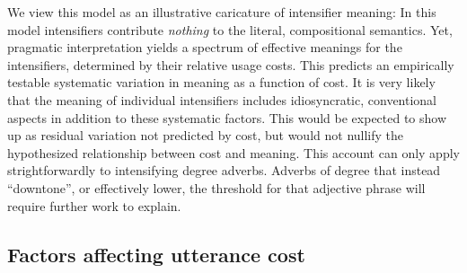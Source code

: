 \documentclass[10pt,letterpaper]{article}
\begin{document}
We view this model as an illustrative caricature of intensifier meaning: In this model intensifiers contribute \emph{nothing} to the literal, compositional semantics.
Yet, pragmatic interpretation yields a spectrum of effective meanings for the intensifiers, determined by their relative usage costs.
This predicts an empirically testable systematic variation in meaning as a function of cost.
It is very likely that the meaning of individual intensifiers includes idiosyncratic, conventional aspects in addition to these systematic factors.
This would be expected to show up as residual variation not predicted by cost, but would not nullify the hypothesized relationship between cost and meaning.
This account can only apply strightforwardly to intensifying degree adverbs.
Adverbs of degree that instead ``downtone'', or effectively lower, the threshold for that adjective phrase will require further work to explain.


% 


\subsection{Factors affecting utterance cost}
\end{document}
